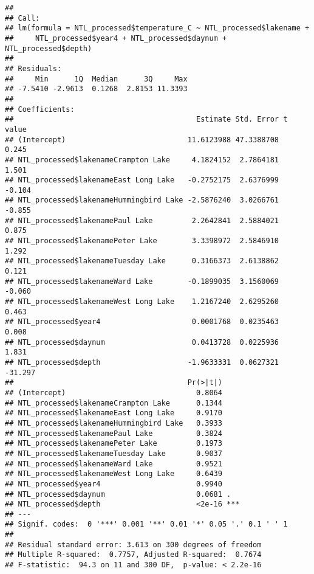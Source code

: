 \documentclass[]{article}
\newenvironment{Shaded}{\begin{snugshade}}{\end{snugshade}}
\newcommand{\KeywordTok}[1]{\textcolor[rgb]{0.13,0.29,0.53}{\textbf{#1}}}
\newcommand{\DecValTok}[1]{\textcolor[rgb]{0.00,0.00,0.81}{#1}}
\newcommand{\StringTok}[1]{\textcolor[rgb]{0.31,0.60,0.02}{#1}}
\newcommand{\CommentTok}[1]{\textcolor[rgb]{0.56,0.35,0.01}{\textit{#1}}}
\newcommand{\OperatorTok}[1]{\textcolor[rgb]{0.81,0.36,0.00}{\textbf{#1}}}
\newcommand{\NormalTok}[1]{#1}
\begin{document}
\begin{Shaded}
\end{Shaded}

\begin{verbatim}
## 
## Call:
## lm(formula = NTL_processed$temperature_C ~ NTL_processed$lakename + 
##     NTL_processed$year4 + NTL_processed$daynum + NTL_processed$depth)
## 
## Residuals:
##     Min      1Q  Median      3Q     Max 
## -7.5410 -2.9613  0.1268  2.8153 11.3393 
## 
## Coefficients:
##                                          Estimate Std. Error t value
## (Intercept)                            11.6123988 47.3388708   0.245
## NTL_processed$lakenameCrampton Lake     4.1824152  2.7864181   1.501
## NTL_processed$lakenameEast Long Lake   -0.2752175  2.6376999  -0.104
## NTL_processed$lakenameHummingbird Lake -2.5876240  3.0266761  -0.855
## NTL_processed$lakenamePaul Lake         2.2642841  2.5884021   0.875
## NTL_processed$lakenamePeter Lake        3.3398972  2.5846910   1.292
## NTL_processed$lakenameTuesday Lake      0.3166373  2.6138862   0.121
## NTL_processed$lakenameWard Lake        -0.1899035  3.1560069  -0.060
## NTL_processed$lakenameWest Long Lake    1.2167240  2.6295260   0.463
## NTL_processed$year4                     0.0001768  0.0235463   0.008
## NTL_processed$daynum                    0.0413728  0.0225936   1.831
## NTL_processed$depth                    -1.9633331  0.0627321 -31.297
##                                        Pr(>|t|)    
## (Intercept)                              0.8064    
## NTL_processed$lakenameCrampton Lake      0.1344    
## NTL_processed$lakenameEast Long Lake     0.9170    
## NTL_processed$lakenameHummingbird Lake   0.3933    
## NTL_processed$lakenamePaul Lake          0.3824    
## NTL_processed$lakenamePeter Lake         0.1973    
## NTL_processed$lakenameTuesday Lake       0.9037    
## NTL_processed$lakenameWard Lake          0.9521    
## NTL_processed$lakenameWest Long Lake     0.6439    
## NTL_processed$year4                      0.9940    
## NTL_processed$daynum                     0.0681 .  
## NTL_processed$depth                      <2e-16 ***
## ---
## Signif. codes:  0 '***' 0.001 '**' 0.01 '*' 0.05 '.' 0.1 ' ' 1
## 
## Residual standard error: 3.613 on 300 degrees of freedom
## Multiple R-squared:  0.7757, Adjusted R-squared:  0.7674 
## F-statistic:  94.3 on 11 and 300 DF,  p-value: < 2.2e-16
\end{verbatim}
\end{document}
